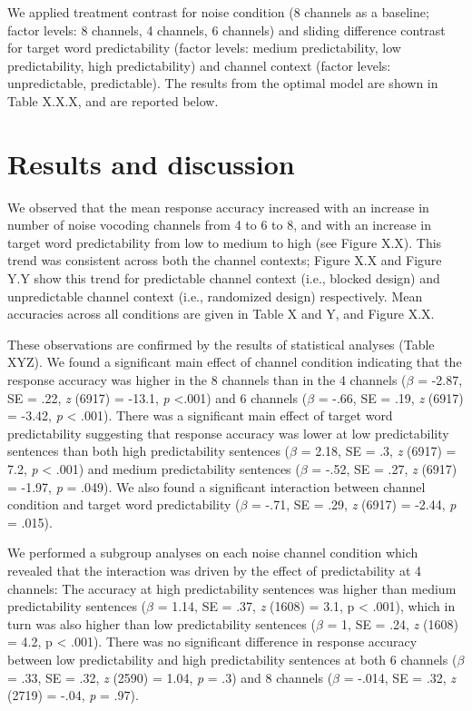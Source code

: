 \documentclass[a4paper, nobind]{templates/ociamthesis}
\begin{document}
We applied treatment contrast for noise condition (8 channels as a baseline; factor levels: 8 channels, 4 channels, 6 channels) and sliding difference contrast for target word predictability (factor levels: medium predictability, low predictability, high predictability) and channel context (factor levels: unpredictable, predictable).
The results from the optimal model are shown in Table X.X.X, and are reported below.

\hypertarget{results-and-discussion-2}{%
\section{Results and discussion}\label{results-and-discussion-2}}

We observed that the mean response accuracy increased with an increase in number of noise vocoding channels from 4 to 6 to 8, and with an increase in target word predictability from low to medium to high (see Figure X.X).
This trend was consistent across both the channel contexts;
Figure X.X and Figure Y.Y show this trend for predictable channel context (i.e., blocked design) and unpredictable channel context (i.e., randomized design) respectively.
Mean accuracies across all conditions are given in Table X and Y, and Figure X.X.

These observations are confirmed by the results of statistical analyses (Table XYZ).
We found a significant main effect of channel condition indicating that the response accuracy was higher in the 8 channels
than in the 4 channels (\(\beta\) = -2.87, SE = .22, \emph{z} (6917) = -13.1, \emph{p} \textless.001) and
6 channels (\(\beta\) = -.66, SE = .19, \emph{z} (6917) = -3.42, \emph{p} \textless{} .001).
There was a significant main effect of target word predictability suggesting that response accuracy was lower at low predictability sentences
than both high predictability sentences (\(\beta\) = 2.18, SE = .3, \emph{z} (6917) = 7.2, \emph{p} \textless{} .001) and
medium predictability sentences (\(\beta\) = -.52, SE = .27, \emph{z} (6917) = -1.97, \emph{p} = .049).
We also found a significant interaction between channel condition and target word predictability (\(\beta\) = -.71, SE = .29, \emph{z} (6917) = -2.44, \emph{p} = .015).

We performed a subgroup analyses on each noise channel condition
which revealed that the interaction was driven by the effect of predictability at 4 channels:
The accuracy at high predictability sentences was higher than medium predictability sentences (\(\beta\) = 1.14, SE = .37, \emph{z} (1608) = 3.1, p \textless{} .001),
which in turn was also higher than low predictability sentences (\(\beta\) = 1, SE = .24, \emph{z} (1608) = 4.2, p \textless{} .001).
There was no significant difference in response accuracy between low predictability and high predictability sentences
at both 6 channels (\(\beta\) = .33, SE = .32, \emph{z} (2590) = 1.04, \emph{p} = .3)
and 8 channels (\(\beta\) = -.014, SE = .32, \emph{z} (2719) = -.04, \emph{p} = .97).
\end{document}
